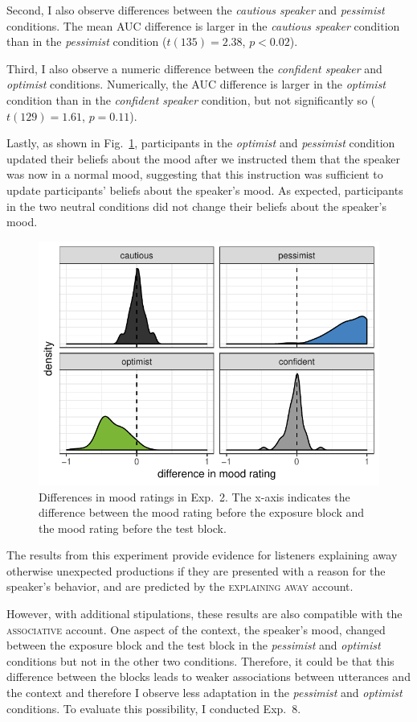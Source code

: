 Second, I also observe differences between the \textit{cautious speaker} and \textit{pessimist} conditions. The mean AUC difference is larger in the \textit{cautious speaker} condition than in the \textit{pessimist} condition  ($t(135)=2.38$, $p < 0.02$).

Third, I also observe a numeric difference between the \textit{confident speaker} and \textit{optimist} conditions. Numerically, the AUC difference is larger in the \textit{optimist} condition than in the \textit{confident speaker} condition, but not significantly so ($t(129) =1.61$, $p = 0.11$).

Lastly, as shown in Fig.~\ref{fig:manip-check-exp7}, participants in the \textit{optimist} and \textit{pessimist} condition updated their beliefs about the mood after we instructed them that the speaker was now in a normal mood, suggesting that this instruction was sufficient to update participants' beliefs about the speaker's mood. As expected, participants in the two neutral conditions did not change their beliefs about the speaker's mood. 

\begin{figure}[t]
    \centering
    \includegraphics[width=.6\columnwidth, trim={0 0.75cm 0 0cm}]{./plots/mood-differences-exp2.pdf}
    \caption{Differences in mood ratings in Exp.~2. The x-axis indicates the difference between the mood rating before the exposure block and the mood rating before the test block.}
    \label{fig:manip-check-exp7}
\end{figure}


The results from this experiment provide evidence for listeners explaining away otherwise unexpected productions if they are presented with a reason for the speaker's behavior, and are predicted by the \textsc{explaining away} account. 

However, with additional stipulations, these results are also compatible with the \textsc{associative} account. One aspect of the context, the speaker's mood, changed between the exposure block and the test block in the \textit{pessimist} and \textit{optimist} conditions but not in the other two conditions. Therefore, it could be that this difference between the blocks leads to weaker associations between utterances and the context and therefore I observe less adaptation in the \textit{pessimist} and \textit{optimist} conditions. To evaluate this possibility, I conducted Exp.~8.



